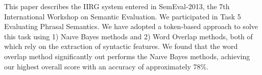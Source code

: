 This paper describes the IIRG system entered in SemEval-2013, the 7th International Workshop on Semantic Evaluation. We participated in Task 5
 Evaluating Phrasal Semantics. We have adopted a token-based approach to solve
 this task using 1) Naıve Bayes methods and 2) Word Overlap methods, both of
 which rely on the extraction of syntactic features. We found that the word
 overlap method significantly out performs the Naıve Bayes methods, achieving
 our highest overall score with an accuracy of approximately 78\%.

